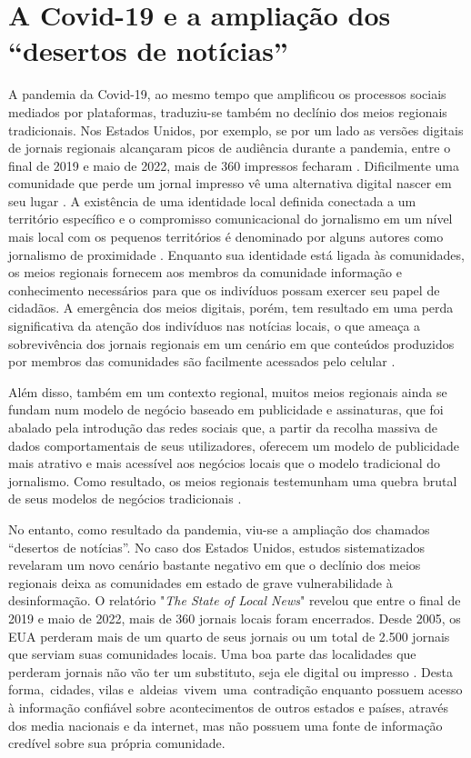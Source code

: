 \documentclass[portuguese]{textolivre}
\begin{document}
\section{A Covid-19 e a ampliação dos “desertos de notícias”}
A pandemia da Covid-19, ao mesmo tempo que amplificou os processos sociais mediados por plataformas, traduziu-se também no declínio dos meios regionais tradicionais. Nos Estados Unidos, por exemplo, se por um lado as versões digitais de jornais regionais alcançaram picos de audiência durante a pandemia, entre o final de 2019 e maio de 2022, mais de 360 impressos fecharam \cite{jolley202, abernathy2022}. Dificilmente uma comunidade que perde um jornal impresso vê uma alternativa digital nascer em seu lugar \cite{abernathy2022}. A existência de uma identidade local definida conectada a um território específico e o compromisso comunicacional do jornalismo em um nível mais local com os pequenos territórios é denominado por alguns autores como jornalismo de proximidade \cite{camponez2002jornalismo, coelho_tv_2003, lopez_garcia_ciberperiodismo_2008, jeronimo2015ciberjornalismo}. Enquanto sua identidade está ligada às comunidades, os meios regionais fornecem aos membros da comunidade informação e conhecimento necessários para que os indivíduos possam exercer seu papel de cidadãos. A emergência dos meios digitais, porém, tem resultado em uma perda significativa da atenção dos indivíduos nas notícias locais, o que ameaça a sobrevivência dos jornais regionais em um cenário em que conteúdos produzidos por membros das comunidades são facilmente acessados pelo celular \cite{jeronimo2013jornalismo, jeronimoespartaza022}.

Além disso, também em um contexto regional, muitos meios regionais ainda se fundam num modelo de negócio baseado em publicidade e assinaturas, que foi abalado pela introdução das redes sociais que, a partir da recolha massiva de dados comportamentais de seus utilizadores, oferecem um modelo de publicidade mais atrativo e mais acessível aos negócios locais que o modelo tradicional do jornalismo. Como resultado, os meios regionais testemunham uma quebra brutal de seus modelos de negócios tradicionais \cite{jeronimoespartaza022}.

No entanto, como resultado da pandemia, viu-se a ampliação dos chamados “desertos de notícias”. No caso dos Estados Unidos, estudos sistematizados revelaram um novo cenário bastante negativo em que o declínio dos meios regionais deixa as comunidades em estado de grave vulnerabilidade à desinformação. O relatório "\emph{The State of Local News}" \cite{abernathy2022} revelou que entre o final de 2019 e maio de 2022, mais de 360 jornais locais foram encerrados. Desde 2005, os EUA perderam mais de um quarto de seus jornais ou um total de 2.500 jornais que serviam suas comunidades locais. Uma boa parte das localidades que perderam jornais não vão ter um substituto, seja ele digital ou impresso \cite{abernathy2022}. Desta forma, cidades, vilas e aldeias vivem uma contradição enquanto possuem acesso à informação confiável sobre acontecimentos de outros estados e países, através dos media nacionais e da internet, mas não possuem uma fonte de informação credível sobre sua própria comunidade.
\end{document}
